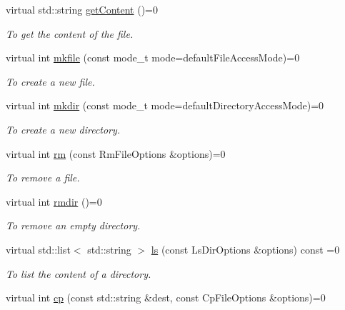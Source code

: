 \begin{DoxyCompactItemize}
virtual std::string \hyperlink{classFileProxy_abcee2624975ecc29a47d45e50aedc807}{getContent} ()=0
\begin{DoxyCompactList}\small\item\em To get the content of the file. \item\end{DoxyCompactList}\item 
virtual int \hyperlink{classFileProxy_a23a6d0ddfc62d7df31cc677adddd58d8}{mkfile} (const mode\_\-t mode=defaultFileAccessMode)=0
\begin{DoxyCompactList}\small\item\em To create a new file. \item\end{DoxyCompactList}\item 
virtual int \hyperlink{classFileProxy_ae177e3649ea348c0975f6aeb4f45bd1f}{mkdir} (const mode\_\-t mode=defaultDirectoryAccessMode)=0
\begin{DoxyCompactList}\small\item\em To create a new directory. \item\end{DoxyCompactList}\item 
virtual int \hyperlink{classFileProxy_ac1f6106e6b799eb2118a9badaca68176}{rm} (const RmFileOptions \&options)=0
\begin{DoxyCompactList}\small\item\em To remove a file. \item\end{DoxyCompactList}\item 
virtual int \hyperlink{classFileProxy_a7d2495abbcfab9828df3c11815db1866}{rmdir} ()=0
\begin{DoxyCompactList}\small\item\em To remove an empty directory. \item\end{DoxyCompactList}\item 
virtual std::list$<$ std::string $>$ \hyperlink{classFileProxy_a11fcbc5ab2a937ee670b9e608ad69cb2}{ls} (const LsDirOptions \&options) const =0
\begin{DoxyCompactList}\small\item\em To list the content of a directory. \item\end{DoxyCompactList}\item 
virtual int \hyperlink{classFileProxy_a857ef4fd0f9b469e0d6edb8a7b932f18}{cp} (const std::string \&dest, const CpFileOptions \&options)=0

\end{DoxyCompactItemize}
